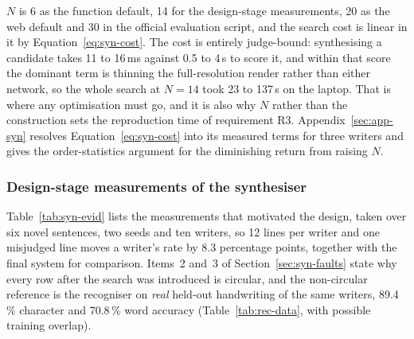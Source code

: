 $N$ is 6 as the function default, 14 for the design-stage measurements, 20 as the web default and 30 in the official evaluation script, and the search cost is linear in it by Equation~\ref{eq:syn-cost}.
The cost is entirely judge-bound: synthesising a candidate takes 11 to 16\,ms against 0.5 to 4\,s to score it, and within that score the dominant term is thinning the full-resolution render rather than either network, so the whole search at $N=14$ took 23 to 137\,s on the laptop.
That is where any optimisation must go, and it is also why $N$ rather than the construction sets the reproduction time of requirement R3.
Appendix~\ref{sec:app-syn} resolves Equation~\ref{eq:syn-cost} into its measured terms for three writers and gives the order-statistics argument for the diminishing return from raising $N$.


\subsubsection{Design-stage measurements of the synthesiser}

Table~\ref{tab:syn-evid} lists the measurements that motivated the design, taken over six novel sentences, two seeds and ten writers, so 12 lines per writer and one misjudged line moves a writer's rate by 8.3 percentage points, together with the final system for comparison.
Items~2 and~3 of Section~\ref{sec:syn-faults} state why every row after the search was introduced is circular, and the non-circular reference is the recogniser on \emph{real} held-out handwriting of the same writers, 89.4\,\% character and 70.8\,\% word accuracy (Table~\ref{tab:rec-data}, with possible training overlap).

